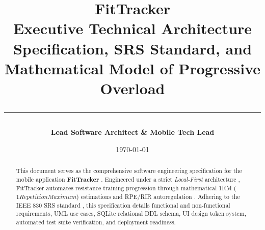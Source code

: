 \documentclass[11pt,a4paper]{article}
\title{
  \vspace{-1.5cm}
  \begin{center}
    {\Huge\sffamily\bfseries\color{primaryblue} FitTracker}\\[0.4em] 
    {\Large\sffamily Executive Technical Architecture Specification, SRS Standard, and Mathematical Model of Progressive Overload}\\[0.6em]
    \rule{\linewidth}{1.2pt}
  \end{center}
}
\author{\textbf{Lead Software Architect \& Mobile Tech Lead}}
\date{\today}
\begin{document}
\maketitle

\begin{abstract}
\noindent This document serves as the comprehensive software engineering specification for the mobile application \textbf{FitTracker} \cite{reactnative2024, expo2024sdk}. Engineered under a strict \textit{Local-First} architecture \cite{kleppmann2019localfirst}, FitTracker automates resistance training progression through mathematical 1RM ($1Repetition Maximum$) estimations \cite{epley1985poundage, brzycki1993strength} and RPE/RIR autoregulation \cite{zourdos2016rpe, helms2016rpe}. Adhering to the IEEE 830 SRS standard \cite{ieee830}, this specification details functional and non-functional requirements, UML use cases, SQLite relational DDL schema, UI design token system, automated test suite verification, and deployment readiness.
\end{abstract}

\vspace{0.5cm}
\tableofcontents
\newpage


\newpage

\newpage

\newpage

\newpage

\newpage

\newpage

\newpage

\newpage


\newpage


\end{document}
